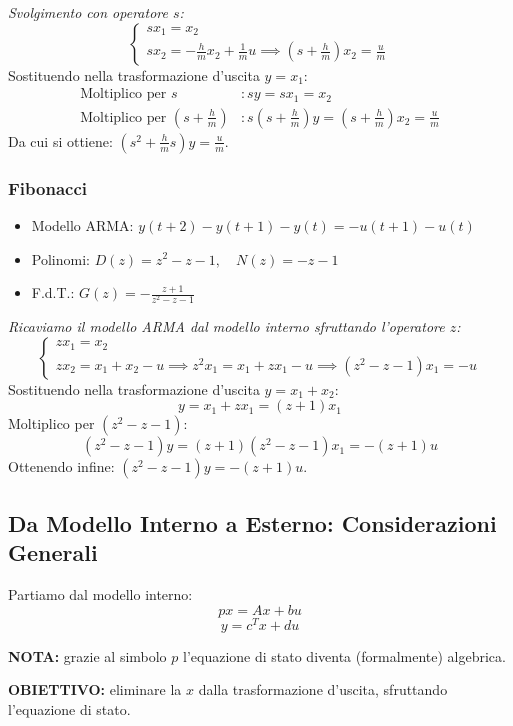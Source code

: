 \documentclass[11pt,a4paper]{article}
\begin{document}
\textit{Svolgimento con operatore $s$:}
$$ \begin{cases}
s x_1 = x_2 \\
s x_2 = -\frac{h}{m}x_2 + \frac{1}{m}u \implies \left(s + \frac{h}{m}\right)x_2 = \frac{u}{m}
\end{cases} $$
Sostituendo nella trasformazione d'uscita $y = x_1$:
\begin{align*}
\text{Moltiplico per } s&: s y = s x_1 = x_2 \\
\text{Moltiplico per } \left(s + \frac{h}{m}\right)&: s\left(s + \frac{h}{m}\right)y = \left(s + \frac{h}{m}\right)x_2 = \frac{u}{m}
\end{align*}
Da cui si ottiene: $\left(s^2 + \frac{h}{m}s\right)y = \frac{u}{m}$.

\subsubsection{Fibonacci}
\begin{itemize}
    \item Modello ARMA: $y(t+2) - y(t+1) - y(t) = -u(t+1) - u(t)$
    \item Polinomi: $D(z) = z^2 - z - 1, \quad N(z) = -z - 1$
    \item F.d.T.: $G(z) = -\frac{z+1}{z^2 - z - 1}$
\end{itemize}

\textit{Ricaviamo il modello ARMA dal modello interno sfruttando l'operatore $z$:}
$$ \begin{cases}
z x_1 = x_2 \\
z x_2 = x_1 + x_2 - u \implies z^2 x_1 = x_1 + z x_1 - u \implies (z^2 - z - 1)x_1 = -u
\end{cases} $$
Sostituendo nella trasformazione d'uscita $y = x_1 + x_2$:
$$ y = x_1 + z x_1 = (z + 1)x_1 $$
Moltiplico per $(z^2 - z - 1)$:
$$ (z^2 - z - 1)y = (z + 1)(z^2 - z - 1)x_1 = -(z + 1)u $$
Ottenendo infine: $(z^2 - z - 1)y = -(z + 1)u$.

\subsection{Da Modello Interno a Esterno: Considerazioni Generali}

Partiamo dal modello interno:
$$ px = Ax + bu $$
$$ y = c^T x + du $$

\textbf{NOTA:} grazie al simbolo $p$ l'equazione di stato diventa (formalmente) algebrica.

\noindent
\textbf{OBIETTIVO:} eliminare la $x$ dalla trasformazione d'uscita, sfruttando l'equazione di stato.
\end{document}
